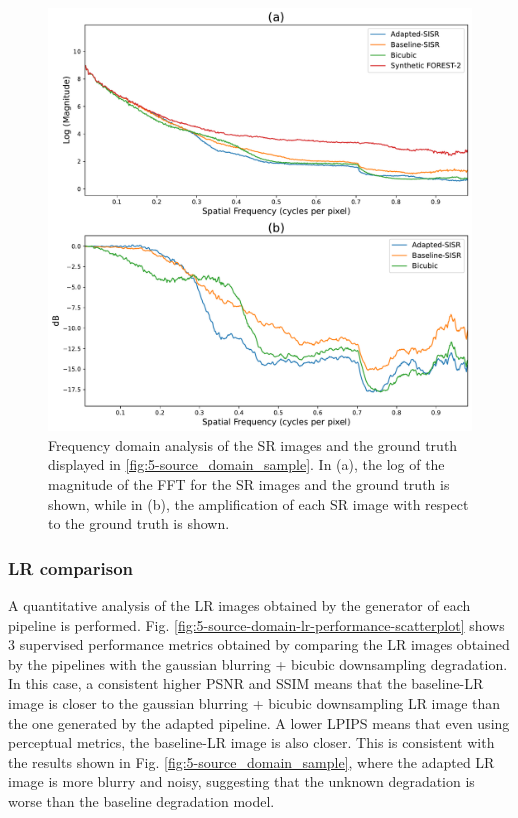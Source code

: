         \begin{figure}[H]
            \centering
            \includegraphics[scale=0.5]{Includes/5-source-sr-fft-comparison.pdf}
            \caption{Frequency domain analysis of the SR images and the ground truth displayed in \ref{fig:5-source_domain_sample}.
                     In (a), the log of the magnitude of the FFT for the SR images and the ground truth is shown,
                     while in (b), the amplification of each SR image with respect to the ground truth is shown.}
            \label{fig:5-source-sr-fft-comparison}
        \end{figure}


        \subsubsection{LR comparison}

        A quantitative analysis of the LR images obtained by the generator of each pipeline is performed. 
        Fig. \ref{fig:5-source-domain-lr-performance-scatterplot} shows 3 supervised performance metrics obtained by comparing the LR images obtained by the pipelines with the gaussian blurring + bicubic downsampling degradation.
        In this case, a consistent higher PSNR and SSIM means that the baseline-LR image is closer to the gaussian blurring + bicubic downsampling LR image than the one generated by the adapted pipeline. 
        A lower LPIPS means that even using perceptual metrics, the baseline-LR image is also closer.
        This is consistent with the results shown in Fig. \ref{fig:5-source_domain_sample}, where the adapted LR image is more blurry and noisy, suggesting that the unknown degradation is worse than the baseline degradation model.
        
